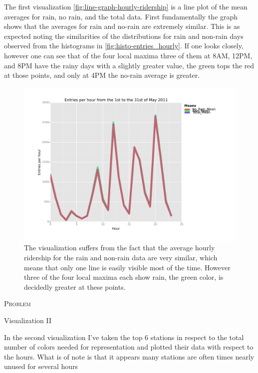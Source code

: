 \documentclass{article}
\numberwithin{questionCtr}{section}
\newcounter{problemCtr}
\newenvironment{problem}{%
   \bigskip\noindent%
   \refstepcounter{problemCtr}%
   \textsc{Problem \theproblemCtr}%
   \newline%
   }{\par\bigskip}  %
\numberwithin{problemCtr}{section}
\begin{document}
The first visualization \autoref{fig:line-graph-hourly-ridership} is a line plot
of the mean averages for rain, no rain, and the total data.  First fundamentally
the graph shows that the averages for rain and no-rain are extremely similar.
This is as expected noting the similarities of the distributions for rain and
non-rain days observed from the histograms in
\autoref{fig:histo-entries_hourly}.  If one looks closely, however one can see
that of the four local maxima three of them at 8AM, 12PM, and 8PM have the rainy
days with a slightly greater value, the green tops the red at those points, and
only at 4PM the no-rain average is greater.

\begin{figure}[ht]
  \centering
  \includegraphics[width=\textwidth]{entries_per_hour.png}
  \caption{The visualization suffers from the fact that the average hourly
    ridership for the rain and non-rain data are very similar, which means that
    only one line is easily visible most of the time.  However three of the four
    local maxima each show rain, the green color, is decidedly greater at these
  points.}
  \label{fig:line-graph-hourly-ridership}
\end{figure}

\begin{problem}
  Visualization II
\end{problem}

In the second visualization I've taken the top 6 stations in respect to the
total number of colors needed for representation and plotted their data with
respect to the hours.  What is of note is that it appears many stations are
often times nearly unused for several hours
\end{document}
